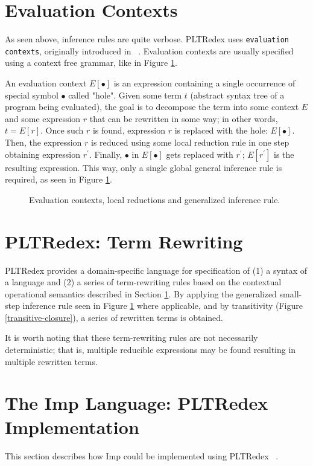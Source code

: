 \section{Evaluation Contexts}
\label{02-evaluation-context}
As seen above, inference rules are quite verbose. PLTRedex uses \texttt{evaluation contexts}, originally introduced in ~\cite{felleisen1992revised}. Evaluation contexts are usually specified using a context free grammar, like in Figure \ref{infer-evaluation}.

An evaluation context $E[\bullet]$ is an expression containing a single occurrence of special symbol $\bullet$ called "hole". Given some term $t$ (abstract syntax tree of a program being evaluated), the goal is to decompose the term into some context $E$ and some expression $r$ that can be rewritten in some way; in other words, $t=E[r]$. Once such $r$ is found, expression $r$ is replaced with the hole: $E[\bullet]$. Then, the expression $r$ is reduced using some local reduction rule in one step obtaining expression $r^\prime$. Finally, $\bullet$ in $E[\bullet]$ gets replaced with $r^\prime$; $E[r^\prime]$ is the resulting expression. This way, only a single global general inference rule is required, as seen in Figure \ref{infer-evaluation}. 

\begin{figure}[htbp]

\caption{Evaluation contexts, local reductions and generalized inference rule.}
\label{infer-evaluation}
\end{figure}

\section{PLTRedex: Term Rewriting}
PLTRedex provides a domain-specific language for specification of (1) a syntax of a language and (2) a series of term-rewriting rules based on the contextual operational semantics described in Section \ref{02-evaluation-context}. By applying the generalized small-step inference rule seen in Figure \ref{infer-evaluation} where applicable, and by transitivity (Figure \ref{transitive-closure}), a series of rewritten terms is obtained.

It is worth noting that these term-rewriting rules are not necessarily deterministic; that is, multiple reducible expressions may be found resulting in multiple rewritten terms.

\section{The Imp Language: PLTRedex Implementation}
\label{02-pltredex}
This section describes how Imp could be implemented using PLTRedex ~\cite{redexreference}. 

